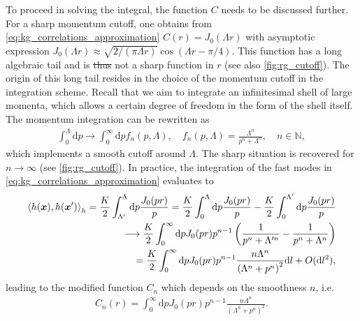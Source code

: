 \documentclass{svmono}
\def\rd{\mathrm d}
\newcommand{\brlr}[1]{\left( #1 \right)}
\providecommand{\DIFdeltex}[1]{{\protect\color{red}\sout{#1}}}                      %
\providecommand{\DIFdelbegin}{} %
\providecommand{\DIFdelend}{} %
\providecommand{\DIFdel}[1]{\texorpdfstring{\DIFdeltex{#1}}{}} %
\newcommand{\DIFscaledelfig}{0.5}
\newlength{\DIFdelgraphicswidth} %
\newlength{\DIFdelgraphicsheight} %
\newcommand{\DIFdelincludegraphics}[2][]{%
\sbox{\DIFdelgraphicsbox}{\DIFOincludegraphics[#1]{#2}}%
\settoboxwidth{\DIFdelgraphicswidth}{\DIFdelgraphicsbox} %
\settoboxtotalheight{\DIFdelgraphicsheight}{\DIFdelgraphicsbox} %
\scalebox{\DIFscaledelfig}{%
\parbox[b]{\DIFdelgraphicswidth}{\usebox{\DIFdelgraphicsbox}\\[-\baselineskip] \rule{\DIFdelgraphicswidth}{0em}}\llap{\resizebox{\DIFdelgraphicswidth}{\DIFdelgraphicsheight}{%
\setlength{\unitlength}{\DIFdelgraphicswidth}%
\begin{picture}(1,1)%
\thicklines\linethickness{2pt} %
{\color[rgb]{1,0,0}\put(0,0){\framebox(1,1){}}}%
{\color[rgb]{1,0,0}\put(0,0){\line( 1,1){1}}}%
{\color[rgb]{1,0,0}\put(0,1){\line(1,-1){1}}}%
\end{picture}%
}\hspace*{3pt}}} %
} %
\DeclareRobustCommand{\DIFdelbegin}{\DIFOdelbegin \let\includegraphics\DIFdelincludegraphics} %
\DeclareRobustCommand{\DIFdelend}{\DIFOaddend \let\includegraphics\DIFOincludegraphics} %
\begin{document}
To proceed in solving the integral, the function $C$ needs to be discussed further.
For a sharp momentum cutoff, one obtains from \cref{eq:kg_correlations_approximation} $C(r) = J_0(\Lambda r)$ with asymptotic expression $J_0(\Lambda r)\approx\sqrt{2/(\pi \Lambda r)}\cos(\Lambda r-\pi/4)$.
This function has a long algebraic tail and is \DIFdelbegin \DIFdel{thus }\DIFdelend not a sharp function in $r$ (see also \cref{fig:rg_cutoff}).
The origin of this long tail resides in the choice of the momentum cutoff in the integration scheme.
Recall that we aim to integrate an infinitesimal shell of large momenta, which allows a certain degree of freedom in the form of the shell itself.
The momentum integration can be rewritten as
\begin{align}
    \int_{0}^{\Lambda}\rd p \rightarrow \int_{0}^\infty\rd p f_n(p,\Lambda),
    \quad
    f_n(p,\Lambda) = \frac{\Lambda^n}{p^n+\Lambda^n},
    \quad
    n\in\mathds N,
    \label{eq:integral_cutoff}
\end{align}
which implements a smooth cutoff around $\Lambda$.
The sharp situation is recovered for $n\rightarrow\infty$ (see \cref{fig:rg_cutoff}).
In practice, the integration of the fast modes in \cref{eq:kg_correlations_approximation} evaluates to
\begin{align}
    \braket{h({\bm x}),h(\bm x')}_h = \frac K2\int_{\Lambda'}^\Lambda\rd p\frac{J_0(p r)}{p} = \frac K2\int_{0}^\Lambda\rd p\frac{J_0(p r)}{p}
    -\frac K2\int_{0}^{\Lambda'}\rd p\frac{J_0(p r)}{p}
    \\
    \longrightarrow
    \frac K2\int_{0}^\infty\rd p J_0(p r)p^{n-1}\brlr{\frac1{p^n+\Lambda'^n}-\frac1{p^n+\Lambda^n}}
    \\
    =
    \frac K2\int_{0}^\infty\rd p J_0(p r)p^{n-1}\frac{n\Lambda^n}{\left(\Lambda^n+p^n\right)^2}\rd l + O(\rd l^2),
    \label{eq:rg_hxhxpr}
\end{align}
leading to the modified function $C_n$ which depends on the smoothness $n$, i.e.
\begin{align}
    C_n(r)
    =
    \int_{0}^\infty\rd p J_0(p r)p^{n-1}\frac{n\Lambda^n}{\left(\Lambda^n+p^n\right)^2}.
    \label{eq:rg_cn_def}
\end{align}
\end{document}
